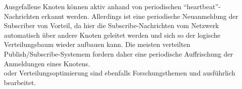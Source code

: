 Ausgefallene Knoten können aktiv anhand von periodischen \enquote{heartbeat}-Nachrichten erkannt werden. Allerdings ist eine periodische Neuanmeldung der Subscriber von Vorteil, da hier die Subscribe-Nachrichten vom Netzwerk automatisch über andere Knoten geleitet werden und sich so der logische Verteilungsbaum wieder aufbauen kann. Die meisten verteilten Publish/Subscribe-Systemem fordern daher eine periodische Auffrischung der Anmeldungen eines Knotens.\\

oder Verteilungsoptimierung \cite{Muhl2002LargeScale} sind ebenfalls Forschungsthemen und ausführlich bearbeitet.
